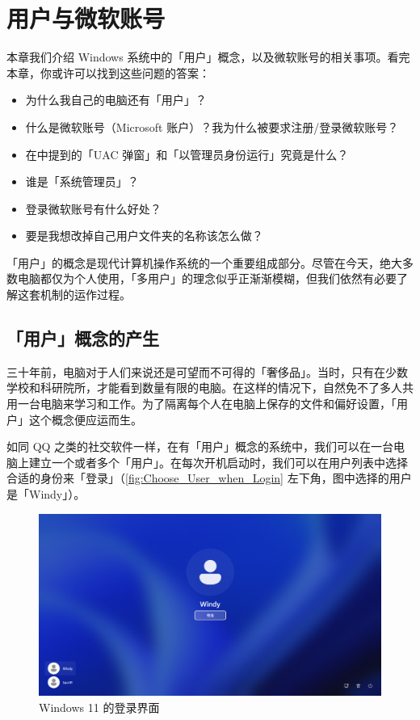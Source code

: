 \chapter{用户与微软账号}
\label{cha:user-and-ms-account}

\begin{intro}
  本章我们介绍 Windows 系统中的「用户」概念，以及微软账号的相关事项。看完本章，你或许可以找到这些问题的答案：

  \begin{itemize}
    \item 为什么我自己的电脑还有「用户」？
    \item 什么是微软账号（Microsoft 账户\footnotemark）？我为什么被要求注册/登录微软账号？
    \item 在中提到的「UAC 弹窗」和「以管理员身份运行」究竟是什么？
    \item 谁是「系统管理员」？
    \item 登录微软账号有什么好处？
    \item 要是我想改掉自己用户文件夹的名称该怎么做？
  \end{itemize}
\end{intro}

「用户」的概念是现代计算机操作系统的一个重要组成部分。尽管在今天，绝大多数电脑都仅为个人使用，「多用户」的理念似乎正渐渐模糊，但我们依然有必要了解这套机制的运作过程。

\section{「用户」概念的产生}

三十年前，电脑对于人们来说还是可望而不可得的「奢侈品」。当时，只有在少数学校和科研院所，才能看到数量有限的电脑。在这样的情况下，自然免不了多人共用一台电脑来学习和工作。为了隔离每个人在电脑上保存的文件和偏好设置，「用户」这个概念便应运而生。

如同 QQ 之类的社交软件一样，在有「用户」概念的系统中，我们可以在一台电脑上建立一个或者多个「用户」。在每次开机启动时，我们可以在用户列表中选择合适的身份来「登录」（\autoref{fig:Choose_User_when_Login} 左下角，图中选择的用户是「Windy」）。

\begin{figure}[htb!]
  \centering
  \includegraphics[width=.7\textwidth]{assets/advanced/Choose_User_when_Login.png}
  \caption{Windows 11 的登录界面}
  \label{fig:Choose_User_when_Login}
\end{figure}

